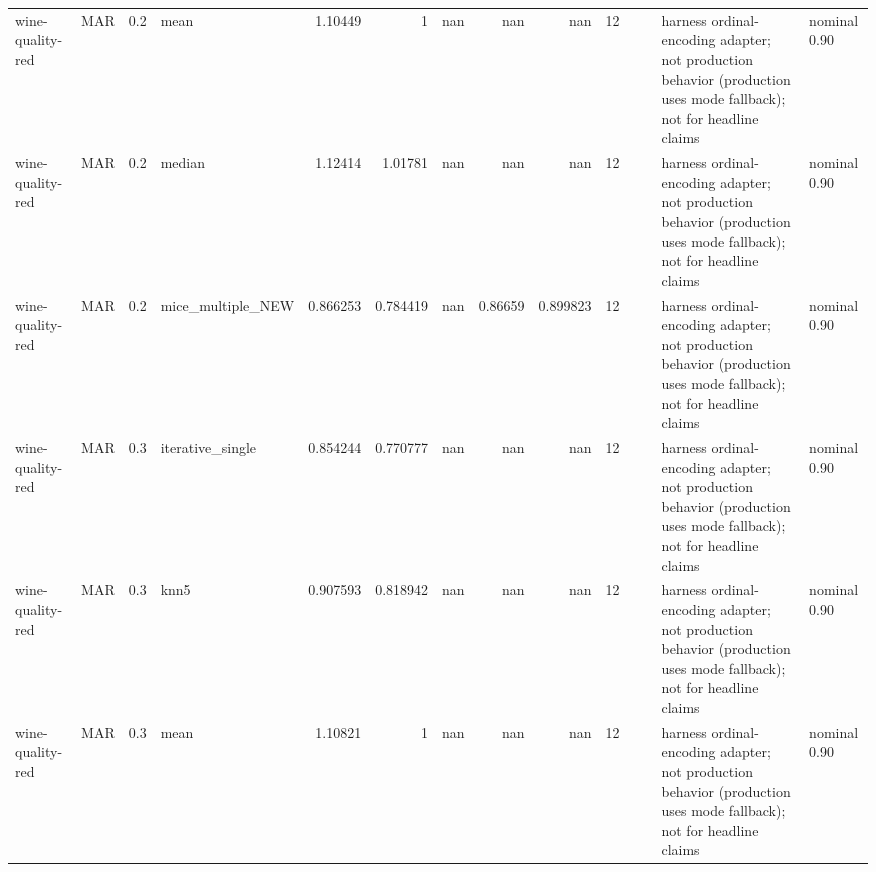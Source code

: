 \begin{table}[ht]
\begin{tabular}{llrlrrrrrrllll}
 wine-quality-red     & MAR         &         0.2 & mean              &       1.10449  &             1        &               nan        &                     nan        &                       nan        &        12 &                    &                                         & harness ordinal-encoding adapter; not production behavior (production uses mode fallback); not for headline claims & nominal 0.90              \\
 wine-quality-red     & MAR         &         0.2 & median            &       1.12414  &             1.01781  &               nan        &                     nan        &                       nan        &        12 &                    &                                         & harness ordinal-encoding adapter; not production behavior (production uses mode fallback); not for headline claims & nominal 0.90              \\
 wine-quality-red     & MAR         &         0.2 & mice\_multiple\_NEW &       0.866253 &             0.784419 &               nan        &                       0.86659  &                         0.899823 &        12 &                    &                                         & harness ordinal-encoding adapter; not production behavior (production uses mode fallback); not for headline claims & nominal 0.90              \\
 wine-quality-red     & MAR         &         0.3 & iterative\_single  &       0.854244 &             0.770777 &               nan        &                     nan        &                       nan        &        12 &                    &                                         & harness ordinal-encoding adapter; not production behavior (production uses mode fallback); not for headline claims & nominal 0.90              \\
 wine-quality-red     & MAR         &         0.3 & knn5              &       0.907593 &             0.818942 &               nan        &                     nan        &                       nan        &        12 &                    &                                         & harness ordinal-encoding adapter; not production behavior (production uses mode fallback); not for headline claims & nominal 0.90              \\
 wine-quality-red     & MAR         &         0.3 & mean              &       1.10821  &             1        &               nan        &                     nan        &                       nan        &        12 &                    &                                         & harness ordinal-encoding adapter; not production behavior (production uses mode fallback); not for headline claims & nominal 0.90              \\

\end{tabular}
\end{table}
